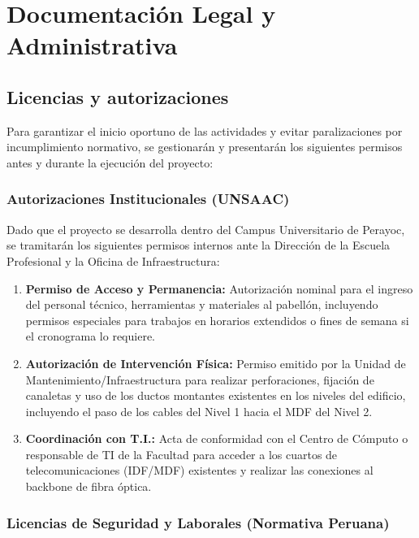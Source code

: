 \chapter{Documentación Legal y Administrativa}

\section{Licencias y autorizaciones}

Para garantizar el inicio oportuno de las actividades y evitar paralizaciones por incumplimiento normativo, se gestionarán y presentarán los siguientes permisos antes y durante la ejecución del proyecto:

\subsection*{Autorizaciones Institucionales (UNSAAC)}

Dado que el proyecto se desarrolla dentro del Campus Universitario de Perayoc, se tramitarán los siguientes permisos internos ante la Dirección de la Escuela Profesional y la Oficina de Infraestructura:

\begin{enumerate}
    \item \textbf{Permiso de Acceso y Permanencia:} Autorización nominal para el ingreso del personal técnico, herramientas y materiales al pabellón, incluyendo permisos especiales para trabajos en horarios extendidos o fines de semana si el cronograma lo requiere.
    \item \textbf{Autorización de Intervención Física:} Permiso emitido por la Unidad de Mantenimiento/Infraestructura para realizar perforaciones, fijación de canaletas y uso de los ductos montantes existentes en los \totalPisos{} niveles del edificio, incluyendo el paso de los cables del Nivel 1 hacia el MDF del Nivel 2.
    \item \textbf{Coordinación con T.I.:} Acta de conformidad con el Centro de Cómputo o responsable de TI de la Facultad para acceder a los cuartos de telecomunicaciones (IDF/MDF) existentes y realizar las conexiones al backbone de fibra óptica.
\end{enumerate}

\subsection*{Licencias de Seguridad y Laborales (Normativa Peruana)}

